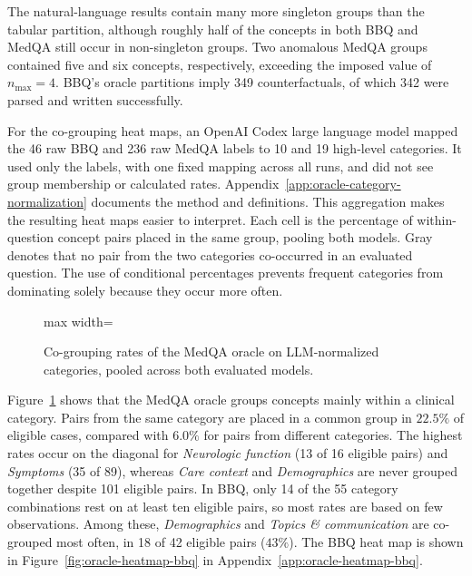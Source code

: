 The natural-language results contain many more singleton groups than the tabular partition, although roughly half of the concepts in both BBQ and MedQA still occur in non-singleton groups. Two anomalous MedQA groups contained five and six concepts, respectively, exceeding the imposed value of $n_{\max}=4$. BBQ's oracle partitions imply 349 counterfactuals, of which 342 were parsed and written successfully.

For the co-grouping heat maps, an OpenAI Codex large language model mapped the 46 raw BBQ and 236 raw MedQA labels to 10 and 19 high-level categories. It used only the labels, with one fixed mapping across all runs, and did not see group membership or calculated rates. Appendix~\ref{app:oracle-category-normalization} documents the method and definitions. This aggregation makes the resulting heat maps easier to interpret. Each cell is the percentage of within-question concept pairs placed in the same group, pooling both models. Gray denotes that no pair from the two categories co-occurred in an evaluated question. The use of conditional percentages prevents frequent categories from dominating solely because they occur more often.

\begin{figure}[htb]
  \centering
  \begin{adjustbox}{max width=\textwidth}
    \OracleHeatmapMedQA
  \end{adjustbox}
  \caption[Oracle co-grouping rates for MedQA]{Co-grouping rates of the MedQA oracle on LLM-normalized categories, pooled across both evaluated models.}
  \label{fig:oracle-heatmap-medqa}
\end{figure}

Figure~\ref{fig:oracle-heatmap-medqa} shows that the MedQA oracle groups concepts mainly within a clinical category. Pairs from the same category are placed in a common group in $22.5\%$ of eligible cases, compared with $6.0\%$ for pairs from different categories. The highest rates occur on the diagonal for \textit{Neurologic function} (13 of 16 eligible pairs) and \textit{Symptoms} (35 of 89), whereas \textit{Care context} and \textit{Demographics} are never grouped together despite 101 eligible pairs. In BBQ, only 14 of the 55 category combinations rest on at least ten eligible pairs, so most rates are based on few observations. Among these, \textit{Demographics} and \textit{Topics \& communication} are co-grouped most often, in 18 of 42 eligible pairs ($43\%$). The BBQ heat map is shown in Figure~\ref{fig:oracle-heatmap-bbq} in Appendix~\ref{app:oracle-heatmap-bbq}.

